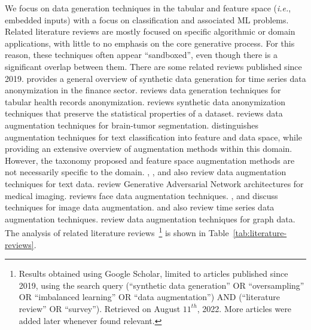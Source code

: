 \documentclass[parskip=full]{scrartcl}
\begin{document}
We focus on data generation techniques in the tabular and feature space
(\textit{i.e.}, embedded inputs) with a focus on classification and associated
ML problems. Related literature reviews are mostly focused on specific
algorithmic or domain applications, with little to no emphasis on the core
generative process. For this reason, these techniques often appear
``sandboxed'', even though there is a significant overlap between them. There
are some related reviews published since 2019. \citet{assefa2020generating}
provides a general overview of synthetic data generation for time series data
anonymization in the finance sector. \citet{hernandez2022synthetic} reviews
data generation techniques for tabular health records anonymization.
\citet{raghunathan2021synthetic} reviews synthetic data anonymization
techniques that preserve the statistical properties of a dataset.
\citet{nalepa2019data} reviews data augmentation techniques for brain-tumor
segmentation. \citet{bayer2021survey} distinguishes augmentation techniques
for text classification into feature and data space, while providing an
extensive overview of augmentation methods within this domain. However, the
taxonomy proposed and feature space augmentation methods are not necessarily
specific to the domain. \citet{shorten2021text}, \citet{chen2021empirical},
\citet{feng2021survey} and \citet{liu2020survey} also review data augmentation
techniques for text data.  \citet{yi2019generative} review Generative
Adversarial Network architectures for medical imaging. \citet{wang2020survey}
reviews face data augmentation techniques. \citet{shorten2019survey},
\citet{khosla2020enhancing} and \citet{khalifa2021comprehensive} discuss
techniques for image data augmentation.  \citet{iwana2021empirical} and
\citet{wen2020time} also review time series data augmentation techniques.
\citet{zhao2022graph} review data augmentation techniques for graph data. The
analysis of related literature reviews~\footnote{Results obtained using Google
    Scholar, limited to articles published since 2019, using the search query
    {\selectfont (``synthetic data generation'' OR
        ``oversampling'' OR ``imbalanced learning'' OR ``data augmentation'')
        AND (``literature review'' OR ``survey'')}. Retrieved on August
    $11^{th}$, 2022. More articles were added later whenever found relevant.
} is shown in Table~\ref{tab:literature-reviews}.
\end{document}
